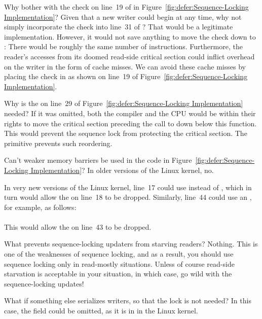 \begin{enumerate}
\QuickQ{}
	Why bother with the check on line~19 of
	 in
	Figure~\ref{fig:defer:Sequence-Locking Implementation}?
	Given that a new writer could begin at any time, why not
	simply incorporate the check into line~31 of
	?
\QuickA{}
	That would be a legitimate implementation.
	However, it would not save anything to move the check down
	to : There would be roughly the same number
	of instructions.
	Furthermore, the reader's accesses from its doomed read-side
	critical section could inflict overhead on the writer in
	the form of cache misses.
	We can avoid these cache misses by placing the check in
	 as shown on line~19 of
	Figure~\ref{fig:defer:Sequence-Locking Implementation}.

\QuickQ{}
	Why is the  on line~29 of
	Figure~\ref{fig:defer:Sequence-Locking Implementation}
	needed?
\QuickA{}
	If it was omitted, both the compiler and the CPU would be
	within their rights to move the critical section preceding
	the call to  down below this function.
	This would prevent the sequence lock from protecting the
	critical section.
	The  primitive prevents such reordering.

\QuickQ{}
	Can't weaker memory barriers be used in the code in
	Figure~\ref{fig:defer:Sequence-Locking Implementation}?
\QuickA{}
	In older versions of the Linux kernel, no.

	In very new versions of the Linux kernel, line~17 could use
	 instead of , which
	in turn would allow the  on line~18 to be dropped.
	Similarly, line~44 could use an , for
	example, as follows: \\
	 \\
	This would allow the  on line~43 to be dropped.

\QuickQ{}
	What prevents sequence-locking updaters from starving readers?
\QuickA{}
	Nothing.
	This is one of the weaknesses of sequence locking, and as a
	result, you should use sequence locking only in read-mostly
	situations.
	Unless of course read-side starvation is acceptable in your
	situation, in which case, go wild with the sequence-locking updates!

\QuickQ{}
	What if something else serializes writers, so that the lock
	is not needed?
\QuickA{}
	In this case, the  field could be omitted, as it
	is in  in the Linux kernel.


\end{enumerate}
